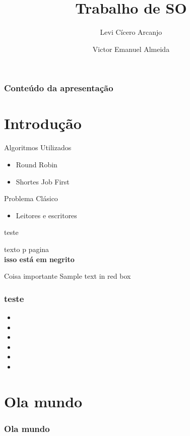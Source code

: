 \documentclass{beamer}
\author[Levi, Victor]{Levi Cícero Arcanjo  \and Victor Emanuel Almeida}
\title{Trabalho de SO}
\begin{document}
	\frame{\titlepage}
	\begin{frame}
		\frametitle{Conteúdo da apresentação}
		\tableofcontents
	\end{frame}
	\section{Introdução}

\begin{frame}{Algoritmos Utilizados}
    
	\begin{itemize}
		\item Round Robin 
		\item Shortes Job First
	\end{itemize}
\end{frame}

\begin{frame}{Problema Clásico}
    
	\begin{itemize}
		\item Leitores e escritores
	\end{itemize}
\end{frame}


\begin{frame}
	teste
	
\end{frame}

	\begin{frame}
		texto p pagina \thepage\\
		\textbf{isso está em negrito}

		\begin{alertblock}{Coisa importante}
			Sample text in red box
		\end{alertblock}
	\end{frame}

	\begin{frame}
		\frametitle{teste}
		\begin{itemize}
			\item 
			\item 
			\item 
			\item 
			\item 
			\item 
		\end{itemize}
	\end{frame}
	\section{Ola mundo}
	\begin{frame}
		\frametitle{Ola mundo}
	\end{frame}
\end{document}

